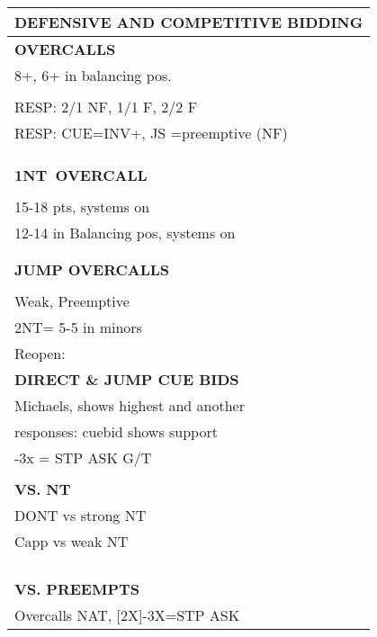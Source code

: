 \documentclass{article}
\newcommand\N{{\footnotesize NT}}
\begin{document}
\noindent
\small{
\begin{minipage}{90mm}
	\begin{tabular}{| p{88mm} |}
		\hline
		\cellcolor[gray]{0.9} \textbf{DEFENSIVE AND COMPETITIVE BIDDING} \\ \hline
		\textbf{OVERCALLS} \\ \hline
                8+, 6+ in balancing pos.
		\\ \hline
		\\ \hline
                RESP: 2/1 NF, 1/1 F, 2/2 F
		\\ \hline
                RESP: CUE=INV+, JS =preemptive (NF)
		\\ \hline
		\\ \hline
		\\ \hline
		\\ \hline
		\textbf{1\N \ OVERCALL} \\ \hline
		\\ \hline
                15-18 pts, systems on
		\\ \hline
                12-14 in Balancing pos, systems on
		\\ \hline
		\\ \hline
		\\ \hline
		\textbf{JUMP OVERCALLS} \\ \hline
		\\ \hline
                Weak, Preemptive
		\\ \hline
                2NT= 5-5 in minors
		\\ \hline
		Reopen: \\ \hline
		\textbf{DIRECT \& JUMP CUE BIDS} \\ \hline
                Michaels, shows highest and another
		\\ \hline
                responses: cuebid shows support
		\\ \hline
                [2x]-3x = STP ASK G/T 
		\\ \hline
		\\ \hline
		\textbf{VS. NT} \\ \hline
                DONT vs strong NT
		\\ \hline
                Capp vs weak NT
		\\ \hline
		\\ \hline
		\\ \hline
		\\ \hline
		\\ \hline
		\textbf{VS. PREEMPTS} \\ \hline
                Overcalls NAT, [2X]-3X=STP ASK

\end{tabular}
\end{minipage}}
\end{document}
